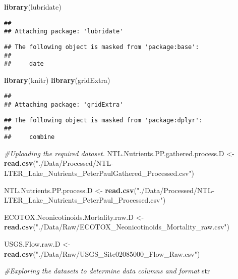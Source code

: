 \documentclass[]{article}
\newenvironment{Shaded}{\begin{snugshade}}{\end{snugshade}}
\newcommand{\KeywordTok}[1]{\textcolor[rgb]{0.13,0.29,0.53}{\textbf{#1}}}
\newcommand{\StringTok}[1]{\textcolor[rgb]{0.31,0.60,0.02}{#1}}
\newcommand{\CommentTok}[1]{\textcolor[rgb]{0.56,0.35,0.01}{\textit{#1}}}
\newcommand{\NormalTok}[1]{#1}
\begin{document}
\begin{Shaded}
\begin{Highlighting}[]
\KeywordTok{library}\NormalTok{(lubridate)}
\end{Highlighting}
\end{Shaded}

\begin{verbatim}
## 
## Attaching package: 'lubridate'
\end{verbatim}

\begin{verbatim}
## The following object is masked from 'package:base':
## 
##     date
\end{verbatim}

\begin{Shaded}
\begin{Highlighting}[]
\KeywordTok{library}\NormalTok{(knitr)}
\KeywordTok{library}\NormalTok{(gridExtra)}
\end{Highlighting}
\end{Shaded}

\begin{verbatim}
## 
## Attaching package: 'gridExtra'
\end{verbatim}

\begin{verbatim}
## The following object is masked from 'package:dplyr':
## 
##     combine
\end{verbatim}

\begin{Shaded}
\begin{Highlighting}[]
\CommentTok{#Uploading the required dataset.}
\NormalTok{NTL.Nutrients.PP.gathered.process.D <-}
\StringTok{  }\KeywordTok{read.csv}\NormalTok{(}\StringTok{"./Data/Processed/NTL-LTER_Lake_Nutrients_PeterPaulGathered_Processed.csv"}\NormalTok{)}

\NormalTok{NTL.Nutrients.PP.process.D <-}
\StringTok{  }\KeywordTok{read.csv}\NormalTok{(}\StringTok{"./Data/Processed/NTL-LTER_Lake_Nutrients_PeterPaul_Processed.csv"}\NormalTok{)}

\NormalTok{ECOTOX.Neonicotinoids.Mortality.raw.D <-}\StringTok{ }
\StringTok{  }\KeywordTok{read.csv}\NormalTok{(}\StringTok{"./Data/Raw/ECOTOX_Neonicotinoids_Mortality_raw.csv"}\NormalTok{)}

\NormalTok{USGS.Flow.raw.D <-}\StringTok{ }
\StringTok{  }\KeywordTok{read.csv}\NormalTok{(}\StringTok{"./Data/Raw/USGS_Site02085000_Flow_Raw.csv"}\NormalTok{)}

\CommentTok{#Exploring the datasets to determine data columns and format}
\NormalTok{str}
\end{Highlighting}
\end{Shaded}
\end{document}
